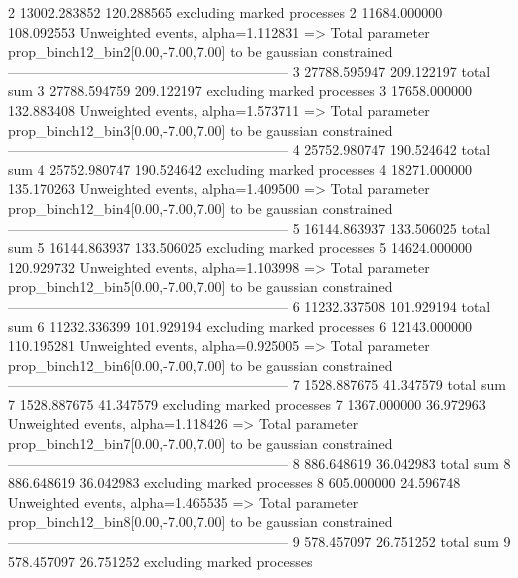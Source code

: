 2          13002.283852    120.288565      excluding marked processes    
2          11684.000000    108.092553      Unweighted events, alpha=1.112831
  => Total parameter prop_binch12_bin2[0.00,-7.00,7.00] to be gaussian constrained
------------------------------------------------------------
3          27788.595947    209.122197      total sum                     
3          27788.594759    209.122197      excluding marked processes    
3          17658.000000    132.883408      Unweighted events, alpha=1.573711
  => Total parameter prop_binch12_bin3[0.00,-7.00,7.00] to be gaussian constrained
------------------------------------------------------------
4          25752.980747    190.524642      total sum                     
4          25752.980747    190.524642      excluding marked processes    
4          18271.000000    135.170263      Unweighted events, alpha=1.409500
  => Total parameter prop_binch12_bin4[0.00,-7.00,7.00] to be gaussian constrained
------------------------------------------------------------
5          16144.863937    133.506025      total sum                     
5          16144.863937    133.506025      excluding marked processes    
5          14624.000000    120.929732      Unweighted events, alpha=1.103998
  => Total parameter prop_binch12_bin5[0.00,-7.00,7.00] to be gaussian constrained
------------------------------------------------------------
6          11232.337508    101.929194      total sum                     
6          11232.336399    101.929194      excluding marked processes    
6          12143.000000    110.195281      Unweighted events, alpha=0.925005
  => Total parameter prop_binch12_bin6[0.00,-7.00,7.00] to be gaussian constrained
------------------------------------------------------------
7          1528.887675     41.347579       total sum                     
7          1528.887675     41.347579       excluding marked processes    
7          1367.000000     36.972963       Unweighted events, alpha=1.118426
  => Total parameter prop_binch12_bin7[0.00,-7.00,7.00] to be gaussian constrained
------------------------------------------------------------
8          886.648619      36.042983       total sum                     
8          886.648619      36.042983       excluding marked processes    
8          605.000000      24.596748       Unweighted events, alpha=1.465535
  => Total parameter prop_binch12_bin8[0.00,-7.00,7.00] to be gaussian constrained
------------------------------------------------------------
9          578.457097      26.751252       total sum                     
9          578.457097      26.751252       excluding marked processes    
